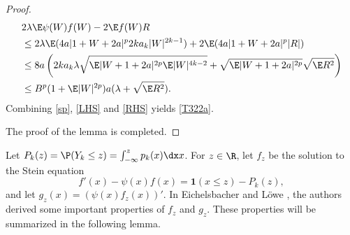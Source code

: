 \begin{proof}
		\begin{equation}\label{RHS} \begin{split} 
				&2\lambda \E \psi(W)f(W)-2\E f(W)R\\
				&\le 2\lambda \E(4a |1+W+2a|^p 2ka_k|W|^{2k-1})+2\E(4a|1+W+2a|^p|R|)\\
				&\le 8a \left(2ka_k\lambda\sqrt{\E|W+1+2a|^{2p}\E |W|^{4k-2}}+\sqrt{\E|W+1+2a|^{2p}}\sqrt{\E R^2}\right) \\
				&\le B^p(1+\E|W|^{2p})a(\lambda+\sqrt{\E R^2}).
			\end{split} 
		\end{equation}
		Combining \eqref{sp}, \eqref{LHS} and \eqref{RHS} yields \eqref{T322a}.
		
		The proof of the lemma is completed. 
	\end{proof}
	
	
	
	Let $P_k(z) = \P(Y_k\le z)= \int_{-\infty}^z p_k(x)\dx x$. For $z\in \R$, let $f_z$ be the solution to the Stein equation 
	\begin{equation}\label{s3} 
		f'(x) - \psi(x)f(x) = \mathbf{1}(x \le z) - P_k(z),
	\end{equation}
	and let $g_z(x)=(\psi(x)f_z(x))'$. In Eichelsbacher and L\"{o}we \cite{eichelsbacher2010stein}, the authors 
	derived some important properties of $f_z$ and $g_z$. These properties will be summarized in the following lemma.
	
